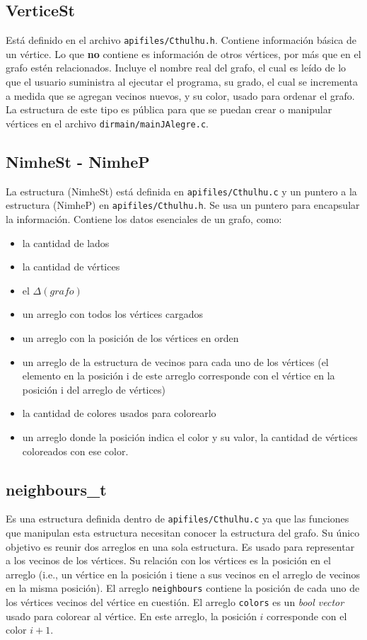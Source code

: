 \documentclass[11pt]{article}   	%
\begin{document}
\subsection{VerticeSt}
Está definido en el archivo \texttt{apifiles/Cthulhu.h}. Contiene información
básica de un vértice. Lo que \textbf{no} contiene es información de otros vértices,
por más que en el grafo estén relacionados. Incluye el nombre real del grafo,
el cual es leído de lo que el usuario suministra al ejecutar el programa, su grado,
el cual se incrementa a medida que se agregan vecinos nuevos, y su color, usado
para ordenar el grafo. La estructura de este tipo es pública para que se puedan
crear o manipular vértices en el archivo \texttt{dirmain/mainJAlegre.c}.

\subsection{NimheSt - NimheP}
La estructura (NimheSt) está definida en \texttt{apifiles/Cthulhu.c} y un
puntero a la estructura (NimheP) en \texttt{apifiles/Cthulhu.h}. Se usa un
puntero para encapsular la información. Contiene los datos esenciales de un
grafo, como:
\begin{itemize}
\item la cantidad de lados
\item la cantidad de vértices
\item el $\Delta(grafo)$
\item un arreglo con todos los vértices cargados
\item un arreglo con la posición de los vértices en orden
\item un arreglo de la estructura de vecinos para cada uno de los vértices
(el elemento en la posición i de este arreglo corresponde con el vértice en
la posición i del arreglo de vértices)
\item la cantidad de colores usados para colorearlo
\item un arreglo donde la posición indica el color y su valor, la cantidad de
vértices coloreados con ese color.
\end{itemize}

\subsection{neighbours\_t}
Es una estructura definida dentro de \texttt{apifiles/Cthulhu.c} ya que las
funciones que manipulan esta estructura necesitan conocer la estructura del
grafo. Su único objetivo es reunir dos arreglos en una sola estructura. Es usado
para representar a los vecinos de los vértices. Su relación con los vértices es
la posición en el arreglo (i.e., un vértice en la posición i tiene a sus vecinos
en el arreglo de vecinos en la misma posición). El arreglo \texttt{neighbours}
contiene la posición de cada uno de los vértices vecinos del vértice en cuestión.
El arreglo \texttt{colors} es un \emph{bool vector} usado para colorear al vértice.
En este arreglo, la posición $i$ corresponde con el color $i+1$.
\end{document}
